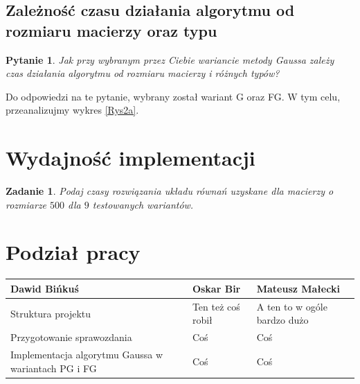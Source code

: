 \documentclass[10pt]{article}
\newtheorem{que}{Pytanie}
\newtheorem{wyd}{Zadanie}
\begin{document}
\subsection{Zależność czasu działania algorytmu od rozmiaru macierzy oraz typu}
\begin{que}
	 Jak przy wybranym przez Ciebie wariancie metody Gaussa zależy czas działania
	algorytmu od rozmiaru macierzy i różnych typów?\label{que:2}
\end{que}
Do odpowiedzi na te pytanie, wybrany został wariant G oraz FG. W tym celu, przeanalizujmy wykres \ref{Rys2a}.\\

\section{Wydajność implementacji}
\begin{wyd}
	Podaj czasy rozwiązania układu równań uzyskane dla macierzy o rozmiarze $500$ dla $9$ testowanych wariantów.
\end{wyd}
\section{Podział pracy}
\centering
	\begin{tabular}{| l | l | l |}
		\hline
		\textbf{Dawid Bińkuś} & \textbf{Oskar Bir} & \textbf{Mateusz Małecki} \\ \hline
		Struktura projektu & Ten też coś robił & A ten to w ogóle bardzo dużo \\ \hline
		Przygotowanie sprawozdania & Coś & Coś\\ \hline
		Implementacja algorytmu Gaussa w wariantach PG i FG & Coś & Coś \\ \hline
		
		
	\end{tabular}
\end{document}
